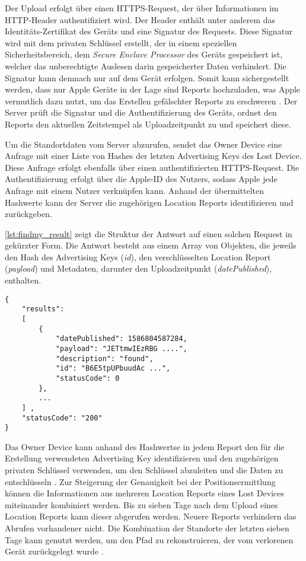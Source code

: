 Der Upload erfolgt über einen HTTPS-Request, der über Informationen im HTTP-Header authentifiziert wird.
Der Header enthält unter anderem das Identitäts-Zertifikat des Geräts und eine Signatur des Requests.
Diese Signatur wird mit dem privaten Schlüssel erstellt, der in einem speziellen Sicherheitsbereich, dem \textit{Secure Enclave Processor} des Geräts gespeichert ist, welcher das unberechtigte Auslesen darin gespeicherter Daten verhindert.
Die Signatur kann demnach nur auf dem Gerät erfolgen.
Somit kann sichergestellt werden, dass nur Apple Geräte in der Lage sind Reports hochzuladen, was Apple vermutlich dazu nutzt, um das Erstellen gefälschter Reports zu erschweren \cite{Heinrich_FindMy}.
Der Server prüft die Signatur und die Authentifizierung des Geräts, ordnet den Reports den aktuellen Zeitstempel als Uploadzeitpunkt zu und speichert diese.

Um die Standortdaten vom Server abzurufen, sendet das Owner Device eine Anfrage mit einer Liste von Hashes der letzten Advertising Keys des Lost Device.
Diese Anfrage erfolgt ebenfalls über einen authentifizierten HTTPS-Request.
Die Authentifizierung erfolgt über die Apple-ID des Nutzers, sodass Apple jede Anfrage mit einem Nutzer verknüpfen kann.
Anhand der übermittelten Hashwerte kann der Server die zugehörigen Location Reports identifizieren und zurückgeben.

\autoref{lst:findmy_result} zeigt die Struktur der Antwort auf einen solchen Request in gekürzter Form.
Die Antwort besteht aus einem Array von Objekten, die jeweils den Hash des Advertising Keys (\textit{id}), den verschlüsselten Location Report (\textit{payload}) und Metadaten, darunter den Uploadzeitpunkt (\textit{datePublished}), enthalten.
\begin{lstlisting}[label=lst:findmy_result,caption={Beispielhafte Antwort beim herunterladen von Location Reports\cite{Heinrich_FindMy}.}]
{
    "results": 
    [
        {
            "datePublished": 1586804587284,
            "payload": "JETtmwIEzRBG ....",
            "description": "found",
            "id": "B6E5tpUPbuudAc ...",
            "statusCode": 0
        },
        ...
    ] ,
    "statusCode": "200"
}
\end{lstlisting}

Das Owner Device kann anhand des Hashwertse in jedem Report den für die Erstellung verwendeten Advertising Key identifizieren und den zugehörigen privaten Schlüssel verwenden, um den Schlüssel abzuleiten und die Daten zu entschlüsseln \cite{Heinrich_FindMy}.
Zur Steigerung der Genauigkeit bei der Positionsermittlung können die Informationen aus mehreren Location Reports eines Lost Devices miteinander kombiniert werden.
Bis zu sieben Tage nach dem Upload eines Location Reports kann dieser abgerufen werden.
Neuere Reports verhindern das Abrufen vorhandener nicht.
Die Kombination der Standorte der letzten sieben Tage kann genutzt werden, um den Pfad zu rekonstruieren, der vom verlorenen Gerät zurückgelegt wurde \cite{Heinrich_FindMy}.
